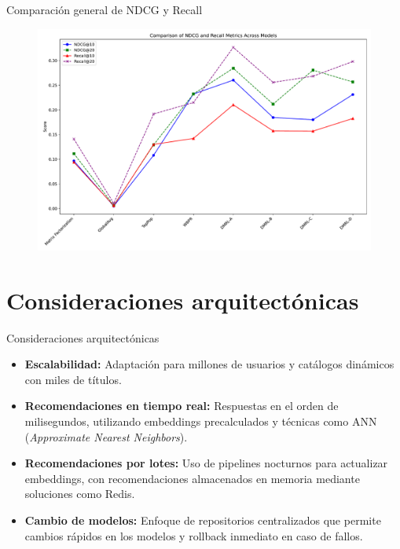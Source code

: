 \documentclass{beamer}
\begin{document}
\begin{frame}{Comparación general de NDCG y Recall}
    \begin{figure}
        \centering
        \includegraphics[width=\textwidth]{images/comparison.pdf}
    \end{figure}
\end{frame}

\section{Consideraciones arquitectónicas}
\begin{frame}{Consideraciones arquitectónicas}
    \begin{itemize}
        \item \textbf{Escalabilidad:} 
        Adaptación para millones de usuarios y catálogos dinámicos con miles de títulos.
        \item \textbf{Recomendaciones en tiempo real:}
        Respuestas en el orden de milisegundos, utilizando embeddings precalculados y técnicas como ANN (\textit{Approximate Nearest Neighbors}).
        \item \textbf{Recomendaciones por lotes:} 
        Uso de pipelines nocturnos para actualizar embeddings, con recomendaciones almacenados en memoria mediante soluciones como Redis.
        \item \textbf{Cambio de modelos:} 
        Enfoque de repositorios centralizados que permite cambios rápidos en los modelos y rollback inmediato en caso de fallos.
    \end{itemize}
\end{frame}
\end{document}
